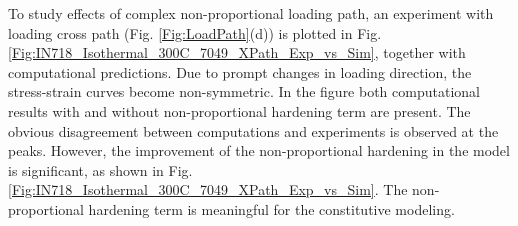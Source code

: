 \documentclass[preprint,5p,twocolumn,11pt,sort&compress]{elsarticle}
\begin{document}
\begin{figure*}[!htp]
\caption{Comparison of the peak stress under isothermal circular non-proportional loading conditions at 300$^{\circ}$C, 550$^{\circ}$C and 650$^{\circ}$C, respectively. (a) The presented model. (b) Fang's model  \cite{fang2015cyclic} .}
\label{Fig:IN718_Isothermal_Axial+-1_PV_Exp_vs_Sim_1}
\end{figure*}

To study effects of complex non-proportional loading path, an experiment with loading cross path (Fig. \ref{Fig:LoadPath}(d)) is plotted in Fig. \ref{Fig:IN718_Isothermal_300C_7049_XPath_Exp_vs_Sim}, together with computational predictions. Due to prompt changes in loading direction, the stress-strain curves become non-symmetric. In the figure both computational results with and without non-proportional hardening term are present. The obvious disagreement between computations and experiments is observed at the peaks. However, the improvement of the non-proportional hardening in the model is significant, as shown in Fig. \ref{Fig:IN718_Isothermal_300C_7049_XPath_Exp_vs_Sim}. The non-proportional hardening term is meaningful for the constitutive modeling.

\begin{figure*}[!htp]
\caption{Comparison between experiments at 300$^{\circ}$C under the cross loading path with computational predictions. (a) Without non-proportional hardening term. (b) With the non-proportional hardening factor $Y_{sat}$ = 200MPa.}
\label{Fig:IN718_Isothermal_300C_7049_XPath_Exp_vs_Sim}
\end{figure*}

\end{document}
